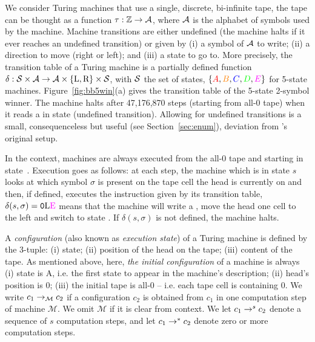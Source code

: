 We consider Turing machines that use a single, discrete, bi-infinite tape, \ie the tape can be thought as a function $\tau: \mathbb{Z} \to \mathcal{A}$, where $\mathcal{A}$ is the alphabet of symbols used by the machine. Machine transitions are either undefined (the machine halts if it ever reaches an undefined transition) or given by (i) a symbol of $\mathcal{A}$ to write; (ii) a direction to move (right or left); and (iii) a state to go to. More precisely, the transition table of a Turing machine is a partially defined function $\delta: \mathcal{S} \times \mathcal{A} \to \mathcal{A} \times \{\text{L},\text{R}\} \times \mathcal{S} $, with $\mathcal{S}$ the set of states, \eg $\{\stateA,\stateB,\stateC,\stateD,\stateE\}$ for 5-state machines. Figure~\ref{fig:bb5win}(a) gives the transition table of the 5-state 2-symbol \BBfull winner. The machine halts after 47,176,870 steps (starting from all-0 tape) when it reads a \szero in state \stateE (undefined transition). Allowing for undefined transitions is a small, consequenceless but useful (see Section~\ref{sec:enum}), deviation from \rado's original setup.

In the \BBfull context, machines are always executed from the all-0 tape and starting in state~\stateA. Execution goes as follows: at each step, the machine which is in state $s$ looks at which symbol $\sigma$ is present on the tape cell the head is currently on and then, if defined, executes the instruction given by its transition table, \eg $\delta(s, \sigma) = \szero\text{L}\text{\stateE}$ means that the machine will write a \szero, move the head one cell to the left and switch to state \stateE. If $\delta(s, \sigma)$ is not defined, the machine halts.



A \textit{configuration} (also known as \textit{execution state}) of a Turing machine is defined by the 3-tuple: (i) state; (ii) position of the head on the tape; (iii) content of the tape. As mentioned above, here, \textit{the initial configuration} of a machine is always (i) state is A, i.e. the first state to appear in the machine's description; (ii) head's position is 0; (iii) the initial tape is all-0 -- i.e. each tape cell is containing 0. We write $c_1 \to_\mathcal{M} c_2$ if a configuration $c_2$ is obtained from $c_1$ in one computation step of machine $\mathcal{M}$. We omit $\mathcal{M}$ if it is clear from context. We let $c_1 \to^s c_2$ denote a sequence of $s$ computation steps, and let $c_1 \to^* c_2$ denote zero or more computation steps. %


